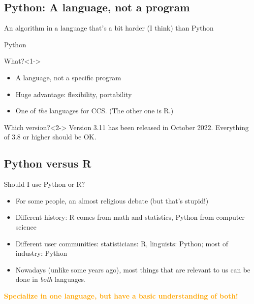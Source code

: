 \subsection{Python: A language, not a program}


\begin{frame}[plain]
	\footnotesize{An algorithm in a language that's a bit harder (I think) than Python}
\end{frame}



\begin{frame}{Python}
	\begin{block}{What?}<1->
		\begin{itemize}
			\item A language, not a specific program
			\item Huge advantage: flexibility, portability
			\item One of \emph{the} languages for CCS. \tiny{(The other one is R.)}
		\end{itemize}
	\end{block}
	
	\begin{block}{Which version?}<2->
          Version 3.11 has been released in October 2022. Everything of 3.8 or higher should be OK.  
	\end{block}
\end{frame}


\subsection{Python versus R}
\begin{frame}{Should I use Python or R?}
	\begin{itemize}
		\item For some people, an almost religious debate (but that's stupid!)
		\item Different history: R comes from math and statistics, Python from computer science
		\item Different user communities: statisticians: R, linguists: Python; most of industry: Python
		\item Nowadays (unlike some years ago), most things that are relevant to us can be done in \emph{both} languages.
	\end{itemize}
\pause
\textcolor{orange}{\textbf{Specialize in one language, but have a basic understanding of both!}}
\end{frame}


